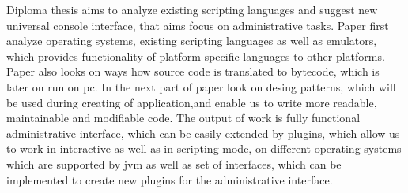 Diploma thesis aims to analyze existing scripting languages and suggest new universal console interface, that aims focus on administrative tasks. Paper first analyze operating systems, existing scripting languages as well as emulators, which provides functionality of platform specific languages to other platforms. Paper also looks on ways how source code is translated to bytecode, which is later on run on \gls{pc}. In the next part of paper look on desing patterns, which will be used during creating of application,and  enable us to write more readable, maintainable and modifiable code. The output of work is fully functional administrative interface, which can be easily extended by plugins, which allow us to work in interactive as well as in scripting mode, on different operating systems which are supported by  \gls{jvm} as well as set of interfaces, which can be implemented to create new plugins for the administrative interface.


